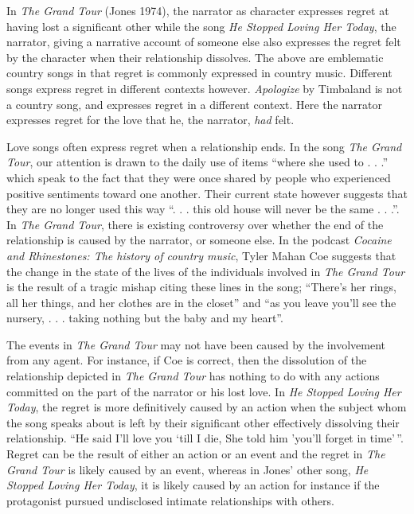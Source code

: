 \documentclass[
  letterpaper,
  DIV=11,
  numbers=noendperiod]{scrreprt}
\begin{document}
\begin{tcolorbox}[enhanced jigsaw, arc=.35mm, breakable, rightrule=.15mm, colback=white, colframe=quarto-callout-important-color-frame, bottomrule=.15mm, leftrule=.75mm, opacityback=0, toprule=.15mm, left=2mm]
\begin{tcolorbox}[enhanced jigsaw, arc=.35mm, breakable, rightrule=.15mm, colback=white, colframe=quarto-callout-tip-color-frame, bottomrule=.15mm, leftrule=.75mm, opacityback=0, toprule=.15mm, left=2mm]
In \emph{The Grand Tour} (Jones 1974), the narrator as character
expresses regret at having lost a significant other while the song
\emph{He Stopped Loving Her Today}, the narrator, giving a narrative
account of someone else also expresses the regret felt by the character
when their relationship dissolves. The above are emblematic country
songs in that regret is commonly expressed in country music. Different
songs express regret in different contexts however. \emph{Apologize} by
Timbaland is not a country song, and expresses regret in a different
context. Here the narrator expresses regret for the love that he, the
narrator, \emph{had} felt.

Love songs often express regret when a relationship ends. In the song
\emph{The Grand Tour}, our attention is drawn to the daily use of items
``where she used to . . .'' which speak to the fact that they were once
shared by people who experienced positive sentiments toward one another.
Their current state however suggests that they are no longer used this
way ``. . . this old house will never be the same . . .''. In \emph{The
Grand Tour}, there is existing controversy over whether the end of the
relationship is caused by the narrator, or someone else. In the podcast
\emph{Cocaine and Rhinestones: The history of country music}, Tyler
Mahan Coe suggests that the change in the state of the lives of the
individuals involved in \emph{The Grand Tour} is the result of a tragic
mishap citing these lines in the song; ``There's her rings, all her
things, and her clothes are in the closet'' and ``as you leave you'll
see the nursery, . . . taking nothing but the baby and my heart''.

The events in \emph{The Grand Tour} may not have been caused by the
involvement from any agent. For instance, if Coe is correct, then the
dissolution of the relationship depicted in \emph{The Grand Tour} has
nothing to do with any actions committed on the part of the narrator or
his lost love. In \emph{He Stopped Loving Her Today}, the regret is more
definitively caused by an action when the subject whom the song speaks
about is left by their significant other effectively dissolving their
relationship. ``He said I'll love you `till I die, She told him 'you'll
forget in time'\,''. Regret can be the result of either an action or an
event and the regret in \emph{The Grand Tour} is likely caused by an
event, whereas in Jones' other song, \emph{He Stopped Loving Her Today},
it is likely caused by an action for instance if the protagonist pursued
undisclosed intimate relationships with others.


\end{tcolorbox}
\end{tcolorbox}
\end{document}
